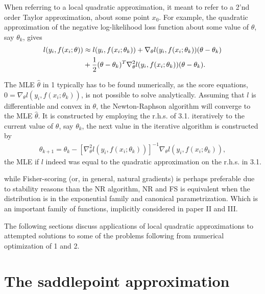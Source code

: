 When referring to a local quadratic approximation, it meant to refer to a 2'nd order Taylor approximation, about some point $x_0$.
For example, the quadratic approximation of the negative log-likelihood loss function about some value of $\theta$, say $\theta_k$, gives
\begin{align}
	l(y_i,f(x_i;\theta))
	&\approx
	l(y_i,f(x_i;\theta_k))
	+ \nabla_\theta l(y_i,f(x_i;\theta_k)) (\theta-\theta_k)\notag\\
	&+ \frac{1}{2}(\theta-\theta_k)^T \nabla_\theta^2 l(y_i,f(x_i;\theta_k)) (\theta-\theta_k).
\end{align}

\begin{Example}
	The MLE $\hat{\theta}$ in 1 typically has to be found numerically, as 
	the score equations, $0=\nabla_\theta l(y_i,f(x_i;\theta_k))$, is not possible to solve 
	analytically. Assuming that $l$ is differentiable and convex in $\theta$, the Newton-Raphson algorithm will converge to the MLE $\hat{\theta}$. 
	It is constructed by employing the r.h.s. of 3.1. iteratively to the current value of $\theta$, say $\theta_k$, the next value in the iterative algorithm is constructed by 
	\begin{align*}
		\theta_{k+1} = \theta_k 
		- \left[\nabla_\theta^2 l(y_i,f(x_i;\theta_k))\right]^{-1}
		\nabla_\theta l(y_i,f(x_i;\theta_k)),
	\end{align*}
	the MLE if $l$ indeed was equal to the quadratic approximation on the r.h.s. in 3.1.
\end{Example}
while Fisher-scoring (or, in general, natural gradients) is perhaps preferable due to stability reasons than the NR algorithm, NR and FS is equivalent when the distribution is in the exponential family and canonical parametrization. Which is an important family of functions, implicitly considered in paper II and III.





The following sections discuss applications of local quadratic approximations to attempted solutions to some of the problems following from numerical optimization of 1 and 2.



\section{The saddlepoint approximation}

